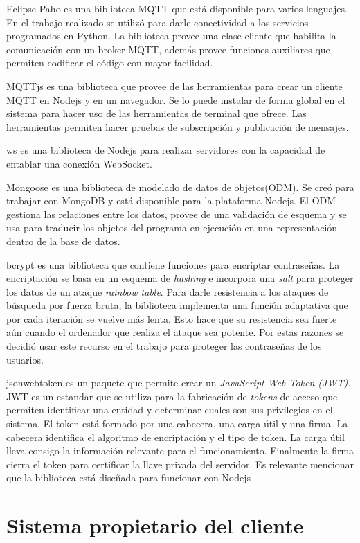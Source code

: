 Eclipse Paho es una biblioteca MQTT que está disponible para varios lenguajes.
En el trabajo realizado se utilizó para darle conectividad a los servicios programados en Python.
La biblioteca provee una clase cliente que habilita la comunicación con un broker MQTT, además provee funciones auxiliares que permiten codificar el código con mayor facilidad.

MQTTjs es una biblioteca que provee de las herramientas para crear un cliente MQTT en Nodejs y en un navegador.
Se lo puede instalar de forma global en el sistema para hacer uso de las herramientas de terminal que ofrece.
Las herramientas permiten hacer pruebas de subscripción y publicación de mensajes.

ws es una biblioteca de Nodejs para realizar servidores con la capacidad de entablar una conexión WebSocket.


Mongoose es una biblioteca de modelado de datos de objetos(ODM).
Se creó para trabajar con MongoDB y está disponible para la plataforma Nodejs.
El ODM gestiona las relaciones entre los datos, provee de una validación de esquema y se usa para traducir los objetos del programa en ejecución en una representación dentro de la base de datos.

bcrypt es una biblioteca que contiene funciones para encriptar contraseñas.
La encriptación se basa en un esquema de \emph{hashing} e incorpora una \emph{salt} para proteger los datos de un ataque \emph{rainbow table}.
Para darle resistencia a los ataques de búsqueda por fuerza bruta, la biblioteca implementa una función adaptativa que por cada iteración se vuelve más lenta.
Esto hace que su resistencia sea fuerte aún cuando el ordenador que realiza el ataque sea potente.
Por estas razones se decidió usar este recurso en el trabajo para proteger las contraseñas de los usuarios.

jsonwebtoken es un paquete que permite crear un \emph{JavaScript Web Token (JWT)}.
JWT es un estandar que se utiliza para la fabricación de \emph{tokens} de acceso que permiten identificar una entidad y determinar cuales son sus privilegios en el sistema.
El token está formado por una cabecera, una carga útil y una firma.
La cabecera identifica el algoritmo de encriptación y el tipo de token.
La carga útil lleva consigo la información relevante para el funcionamiento.
Finalmente la firma cierra el token para certificar la llave privada del servidor.
Es relevante mencionar que la biblioteca está diseñada para funcionar con Nodejs




\section{Sistema propietario del cliente}